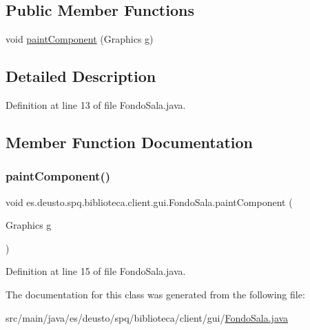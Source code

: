 \subsection*{Public Member Functions}
\begin{DoxyCompactItemize}
\item 
void \mbox{\hyperlink{classes_1_1deusto_1_1spq_1_1biblioteca_1_1client_1_1gui_1_1_fondo_sala_af17076c12afa2d9bdade7b85118aaa56}{paint\+Component}} (Graphics g)
\end{DoxyCompactItemize}


\subsection{Detailed Description}


Definition at line 13 of file Fondo\+Sala.\+java.



\subsection{Member Function Documentation}
\mbox{\label{classes_1_1deusto_1_1spq_1_1biblioteca_1_1client_1_1gui_1_1_fondo_sala_af17076c12afa2d9bdade7b85118aaa56}} 
\subsubsection{\texorpdfstring{paint\+Component()}{paintComponent()}}
{\footnotesize\ttfamily void es.\+deusto.\+spq.\+biblioteca.\+client.\+gui.\+Fondo\+Sala.\+paint\+Component (\begin{DoxyParamCaption}\item[{Graphics}]{g }\end{DoxyParamCaption})}



Definition at line 15 of file Fondo\+Sala.\+java.



The documentation for this class was generated from the following file\+:\begin{DoxyCompactItemize}
\item 
src/main/java/es/deusto/spq/biblioteca/client/gui/\mbox{\hyperlink{_fondo_sala_8java}{Fondo\+Sala.\+java}}\end{DoxyCompactItemize}
